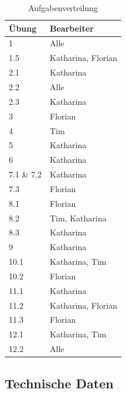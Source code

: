 \documentclass[12pt,a4paper,bibliography=totocnumbered,listof=totocnumbered]{scrartcl}
\begin{document}
    \begin{table}[h]
        \centering
        \caption{Aufgabenverteilung}
        \label{tab:Aufgabenverteilung}
        \begin{tabular}{|l|l|}
            \hline
            \textbf{Übung} & \textbf{Bearbeiter} \\ \hline
            1 & Alle  \\ \hline
            1.5 & Katharina, Florian   \\ \hline
            2.1 &  Katharina      \\ \hline
            2.2 &  Alle      \\ \hline
            2.3 &  Katharina      \\ \hline
            3 &    Florian    \\ \hline
            4   &      Tim  \\ \hline
            5   &      Katharina  \\ \hline
            6   &    Katharina    \\ \hline
            7.1 \& 7.2  &     Katharina   \\ \hline
            7.3 &    Florian    \\ \hline
            8.1 &    Florian    \\ \hline
            8.2 &    Tim, Katharina    \\ \hline
            8.3 &    Katharina    \\ \hline
            9 &     Katharina   \\ \hline
            10.1 &    Katharina, Tim    \\ \hline
            10.2 &     Florian   \\ \hline
            11.1 &   Katharina     \\ \hline
            11.2 &   Katharina, Florian     \\ \hline
            11.3 &   Florian    \\ \hline
            12.1 &     Katharina, Tim    \\ \hline
            12.2 &    Alle    \\ \hline
        \end{tabular}
    \end{table}
\newpage
    \subsection{Technische Daten}
    \vspace{1em}
\end{document}
